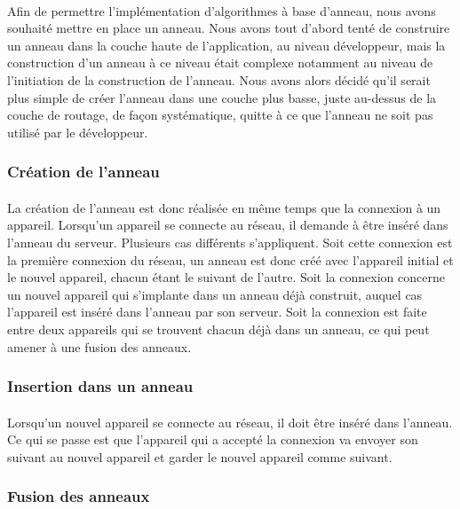\documentclass[a4paper,10pt]{report}
\begin{document}
    \paragraph{}
    Afin de permettre l'implémentation d'algorithmes à base d'anneau, nous avons souhaité mettre en place un anneau. Nous avons tout d'abord tenté de construire un anneau dans la couche haute de l'application, au niveau développeur, mais la construction d'un anneau à ce niveau était complexe notamment au niveau de l'initiation de la construction de l'anneau. Nous avons alors décidé qu'il serait plus simple de créer l'anneau dans une couche plus basse, juste au-dessus de la couche de routage, de façon systématique, quitte à ce que l'anneau ne soit pas utilisé par le développeur.
    
      \subsubsection{Création de l'anneau}
      \paragraph{}
      La création de l'anneau est donc réalisée en même temps que la connexion à un appareil. Lorsqu'un appareil se connecte au réseau, il demande à être inséré dans l'anneau du serveur. Plusieurs cas différents s'appliquent. Soit cette connexion est la première connexion du réseau, un anneau est donc créé avec l'appareil initial et le nouvel appareil, chacun étant le suivant de l'autre. Soit la connexion concerne un nouvel appareil qui s'implante dans un anneau déjà construit, auquel cas l'appareil est inséré dans l'anneau par son serveur. Soit la connexion est faite entre deux appareils qui se trouvent chacun déjà dans un anneau, ce qui peut amener à une fusion des anneaux.
      
      \subsubsection{Insertion dans un anneau}
      \paragraph{}
      Lorsqu'un nouvel appareil se connecte au réseau, il doit être inséré dans l'anneau. Ce qui se passe est que l'appareil qui a accepté la connexion va envoyer son suivant au nouvel appareil et garder le nouvel appareil comme suivant.
      
      \subsubsection{Fusion des anneaux}
\end{document}
